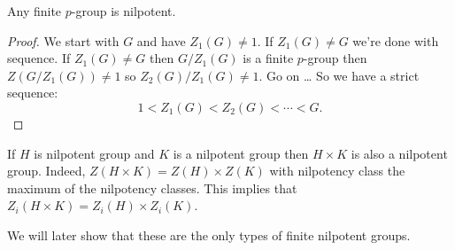 \begin{corollary}
Any finite $p$-group is nilpotent.
\end{corollary}
\begin{proof}
    We start with $G$ and have  $Z_1(G) \neq 1$.
    If $ Z_1(G) \neq G$ we're done with sequence.
    If $ Z_1(G) \neq G$ then $G / Z_1(G)$ is a finite $p$-group
    then $Z(G / Z_1(G)) \neq 1$ so $Z_2(G) / Z_1(G) \neq 1$.
    Go on \ldots
    So we have a strict sequence:
    \[
        1 < Z_1(G) < Z_2(G) < \cdots < G
    .\] 
\end{proof}

\begin{eg}
    If $H$ is nilpotent group and $K$ is a nilpotent group then $H \times K$ is also a nilpotent group.
    Indeed, $Z(H \times K) = Z(H) \times Z(K)$ with nilpotency class the maximum of the nilpotency classes.
    This implies that $Z_i(H \times K) = Z_i(H) \times Z_i(K)$.

    We will later show that these are the only types of finite nilpotent groups.
\end{eg}
